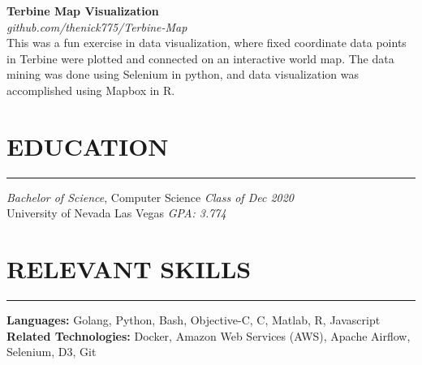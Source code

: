 \documentclass{res}
\begin{document}
\begin{resume}
		{\bf Terbine Map Visualization} \\
			\emph{github.com/thenick775/Terbine-Map} \hfill \vspace{3pt} \\
			This was a fun exercise in data visualization, where fixed coordinate data points in Terbine were plotted and connected on an interactive world map. The data mining was done using Selenium in python, and data visualization was accomplished using Mapbox in R.

		\section{{EDUCATION}}
    \noindent\rule[0.5ex]{\linewidth}{1pt}
		{\sl Bachelor of Science}, Computer Science \hfill \emph{Class of Dec 2020} \\
		University of Nevada Las Vegas \hfill \emph{GPA: 3.774} \\ \vspace{-4mm}

		\section{{RELEVANT SKILLS}}
    \noindent\rule[0.5ex]{\linewidth}{1pt}
			{\bf Languages:} Golang, Python, Bash, Objective-C, C, Matlab, R, Javascript \\
			{\bf Related Technologies:} Docker, Amazon Web Services (AWS), Apache Airflow, Selenium, D3, Git

	\end{resume}
\end{document}
